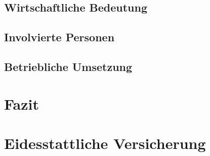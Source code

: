 \documentclass[10pt]{article}
\begin{document}
\subsection{Wirtschaftliche Bedeutung}
\subsection{Involvierte Personen}
\subsection{Betriebliche Umsetzung}
\section{Fazit}
\section{Eidesstattliche Versicherung}
\end{document}

